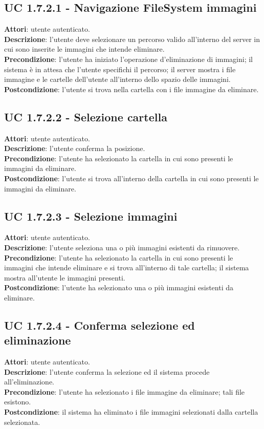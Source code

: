 		\subsection{UC 1.7.2.1 - Navigazione FileSystem immagini}{
			\label{uc1.7.2.1}
			\textbf{Attori}: utente autenticato. \\
			\textbf{Descrizione}: l'utente deve selezionare un percorso valido all'interno del server in cui sono inserite le immagini che intende eliminare. \\
			\textbf{Precondizione}: l'utente ha iniziato l'operazione d'eliminazione di immagini; il sistema è in attesa che l'utente specifichi il percorso; il server mostra i file immagine e le cartelle dell'utente all'interno dello spazio delle immagini.	\\
			\textbf{Postcondizione}: l'utente si trova nella cartella con i file immagine da eliminare.	\\
			}
		\subsection{UC 1.7.2.2 - Selezione cartella}{
			\label{uc1.7.2.2}
			\textbf{Attori}: utente autenticato. \\
			\textbf{Descrizione}: l'utente conferma la posizione. \\
			\textbf{Precondizione}: l'utente ha selezionato la cartella in cui sono presenti le immagini da eliminare.	\\
			\textbf{Postcondizione}: l'utente si trova all'interno della cartella in cui sono presenti le immagini da eliminare. 	\\
			}
		\subsection{UC 1.7.2.3 - Selezione immagini}{
			\label{uc1.7.2.3}
			\textbf{Attori}: utente autenticato. \\
			\textbf{Descrizione}: l'utente seleziona una o più immagini esistenti da rimuovere. \\
			\textbf{Precondizione}: l'utente ha selezionato la cartella in cui sono presenti le immagini che intende eliminare e si trova all'interno di tale cartella; il sistema mostra all'utente le immagini presenti.	\\
			\textbf{Postcondizione}: l'utente ha selezionato una o più immagini esistenti da eliminare.	\\
			}
		\subsection{UC 1.7.2.4 - Conferma selezione ed eliminazione}{
			\label{uc1.7.2.4}
			\textbf{Attori}: utente autenticato. \\
			\textbf{Descrizione}: l'utente conferma la selezione ed il sistema procede all'eliminazione. \\
			\textbf{Precondizione}: l'utente ha selezionato i file immagine da eliminare; tali file esistono.	\\
			\textbf{Postcondizione}: il sistema ha eliminato i file immagini selezionati dalla cartella selezionata.	\\
			}

